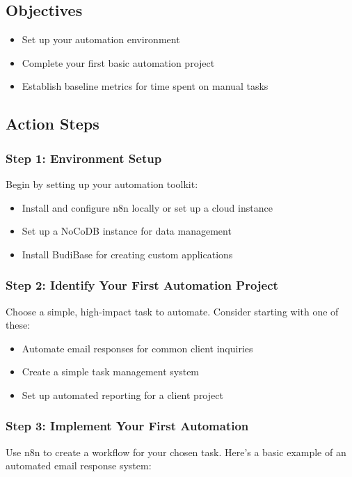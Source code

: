 \subsection{Objectives}
\begin{itemize}
    \item Set up your automation environment
    \item Complete your first basic automation project
    \item Establish baseline metrics for time spent on manual tasks
\end{itemize}

\subsection{Action Steps}

\subsubsection{Step 1: Environment Setup}
Begin by setting up your automation toolkit:

\begin{itemize}
    \item Install and configure n8n locally or set up a cloud instance
    \item Set up a NoCoDB instance for data management
    \item Install BudiBase for creating custom applications
\end{itemize}


\subsubsection{Step 2: Identify Your First Automation Project}
Choose a simple, high-impact task to automate. Consider starting with one of these:

\begin{itemize}
    \item Automate email responses for common client inquiries
    \item Create a simple task management system
    \item Set up automated reporting for a client project
\end{itemize}

\subsubsection{Step 3: Implement Your First Automation}
Use n8n to create a workflow for your chosen task. Here's a basic example of an automated email response system:

